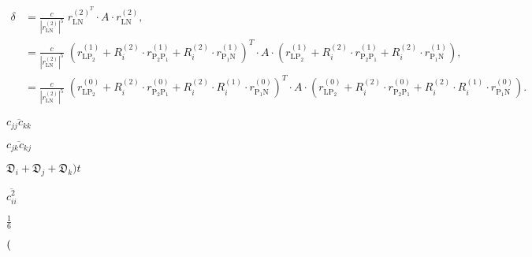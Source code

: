 \documentclass[a4paper,11pt,twoside,openright]{book}
\def\lthtmlcheckvsize{\ifdim\ht\sizebox<\vsize 
  \ifdim\wd\sizebox<\hsize\expandafter\hfill\fi \expandafter\vfill
  \else\expandafter\vss\fi}%
\begin{document}
{\newpage\clearpage
\setcounter{equation}{64}
%
\begin{subequations}\begin{align}
\delta &= \frac{c}{\left| r_{\textrm{LN}}^{(2)} \right|^5} \;
r_{\textrm{LN}}^{(2)^T} \cdot A \cdot r_{\textrm{LN}}^{(2)} , \\
&= \frac{c}{\left| r_{\textrm{LN}}^{(2)} \right|^5} \;
\left( r_{\textrm{LP}_2}^{(1)} + R_i^{(2)} \cdot r_{\textrm{P}_2 \textrm{P}_1}^{(1)} + R_i^{(2)} \cdot r_{\textrm{P}_1 \textrm{N}}^{(1)} \right)^T
\cdot A \cdot
\left( r_{\textrm{LP}_2}^{(1)} + R_i^{(2)} \cdot r_{\textrm{P}_2 \textrm{P}_1}^{(1)} + R_i^{(2)} \cdot r_{\textrm{P}_1 \textrm{N}}^{(1)} \right) , \\
&= \frac{c}{\left| r_{\textrm{LN}}^{(2)} \right|^5} \;
\left( r_{\textrm{LP}_2}^{(0)} + R_i^{(2)} \cdot r_{\textrm{P}_2 \textrm{P}_1}^{(0)} + R_i^{(2)} \cdot R_i^{(1)} \cdot r_{\textrm{P}_1 \textrm{N}}^{(0)} \right)^T
\cdot A \cdot
\left( r_{\textrm{LP}_2}^{(0)} + R_i^{(2)} \cdot r_{\textrm{P}_2 \textrm{P}_1}^{(0)} + R_i^{(2)} \cdot R_i^{(1)} \cdot r_{\textrm{P}_1 \textrm{N}}^{(0)} \right) .
\end{align}\end{subequations}%
\lthtmldisplayZ
\lthtmlcheckvsize\clearpage}

{\newpage\clearpage
{}%
$\displaystyle \overline{{c_{jj}c_{kk}}}$%
\lthtmlindisplaymathZ
\lthtmlcheckvsize\clearpage}

{\newpage\clearpage
{}%
$\displaystyle \overline{{c_{jk}c_{kj}}}$%
\lthtmlindisplaymathZ
\lthtmlcheckvsize\clearpage}

{\newpage\clearpage
{}%
$\scriptstyle \mathfrak{D}_i + \mathfrak{D}_j + \mathfrak{D}_k)t$%
\lthtmlindisplaymathZ
\lthtmlcheckvsize\clearpage}

{\newpage\clearpage
{}%
$\displaystyle \overline{{c_{ii}^2}}$%
\lthtmlindisplaymathZ
\lthtmlcheckvsize\clearpage}

{\newpage\clearpage
{}%
$\displaystyle {\tfrac{{1}}{{6}}}$%
\lthtmlindisplaymathZ
\lthtmlcheckvsize\clearpage}

{\newpage\clearpage
{}%
$\displaystyle \left(\vphantom{2 + \mu_i }\right.$%
\lthtmlindisplaymathZ
\lthtmlcheckvsize\clearpage}
\end{document}
